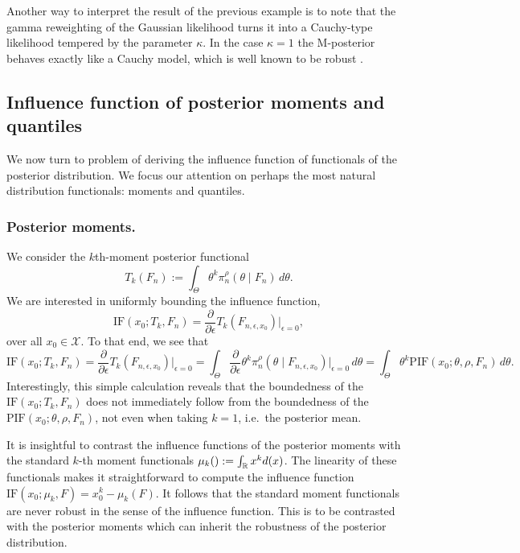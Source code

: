\documentclass[11pt, oneside]{amsart}
\theoremstyle{definition}   %
\let\P\relax
\newcommand{\P}{\mathbb{P}}
\newcommand{\loss}{\rho}
\newcommand{\mposterior}{\pi_n^{\loss}}
\begin{document}
Another way to interpret the result of the previous example is to note that the gamma reweighting of the Gaussian likelihood turns it into a Cauchy-type likelihood tempered by the parameter $\kappa$. In the case $\kappa=1$ the M-posterior behaves exactly like a Cauchy model, which is well known to be robust \citep{clarke1983}.


\subsection{Influence function of posterior moments and quantiles}
\label{sec:IF_moments_quantiles}
%
We now turn to problem of deriving the influence function of functionals of the posterior distribution. We focus our attention on perhaps the most natural distribution functionals: moments and quantiles. 

\subsubsection{Posterior moments.}

We consider the $k$th-moment posterior functional 
%
\[
    T_k(F_n) := \int_\Theta \theta^k \mposterior(\theta \mid F_n) \, d\theta.
\]
%
 We are interested in uniformly bounding the influence function,
%
\begin{equation*}
    \textrm{IF}(x_0; T_k, F_n) = \frac{\partial}{\partial \epsilon} T_k ( F_{n,\epsilon,x_0}) \Big |_{\epsilon=0},
\end{equation*}
%
over all \( x_0 \in \mathcal{X}\). To that end, we see that
%
\begin{equation}
\label{eqn::influence-function-of-the-posterior-moment}
     \textrm{IF}(x_0; T_k, F_n) =  \frac{\partial}{\partial \epsilon} T_k ( F_{n,\epsilon,x_0}) \Big |_{\epsilon=0} =
    \int_\Theta  \frac{\partial}{\partial \epsilon} \theta^k \mposterior(\theta \mid F_{n,\epsilon,x_0}) \Big |_{\epsilon=0} \, d\theta =
    \int_\Theta \theta^k \textrm{PIF}(x_0; \theta,\rho, F_n) \, d\theta.
\end{equation}
%
Interestingly, this simple calculation reveals that the boundedness of the \( \textrm{IF}(x_0; T_k,F_n) \) does not immediately follow from the boundedness of the \( \textrm{PIF}(x_0; \theta, \rho, F_n) \), not even when taking \( k = 1\), i.e.\ the posterior mean.

It is insightful to contrast the influence functions of the posterior moments with the standard $k$-th moment functionals $\mu_k(\P):=\int_{\mathbb{R}} x^kd\P(x)$. The linearity of these functionals makes it straightforward to compute the influence function
%
$\textrm{IF}(x_0; \mu_k, F)=x_0^k-\mu_k(F).$
%
It follows that the standard moment functionals are never robust in the sense of the influence function. This is to be contrasted with the posterior moments which can inherit the robustness of the posterior distribution. 
\end{document}
